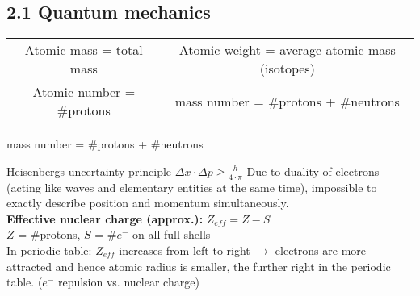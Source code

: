 \subsection{2.1 Quantum mechanics}
    \begin{scriptsize}
        \begin{tabular}{c c}
            Atomic mass = total mass & Atomic weight = average atomic mass (isotopes)\\
            Atomic number = \#protons & mass number = \#protons + \#neutrons
        \end{tabular}
    \end{scriptsize}
    
            \item mass number = \#protons + \#neutrons
        
        Heisenbergs uncertainty principle $\Delta x \cdot \Delta p \geq \frac{h}{4 \cdot \pi}$ Due to duality of electrons (acting like waves and elementary entities at the same time), impossible to exactly describe position and momentum simultaneously.\\
        \textbf{Effective nuclear charge (approx.):}   $Z_{eff} = Z-S$\\
        $Z$ = \#protons, $S$ = \#$e^-$ on all full shells
        \vspace{1mm}\\
        In periodic table: $Z_{eff}$ increases from left to right $\rightarrow$ electrons are more attracted and hence atomic radius is smaller, the further right in the periodic table. ($e^-$ repulsion vs. nuclear charge)
        \vspace*{0.0em}